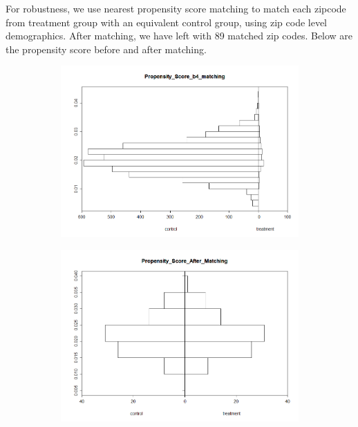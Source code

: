 For robustness, we use nearest propensity score matching to match each zipcode from treatment group with an equivalent control group, using zip code level demographics. After matching, we have left with 89 matched zip codes. Below are the propensity score before and after matching.

\begin{figure}
     \centering
     \begin{subfigure}
         \centering
         \includegraphics[width=\textwidth]{b4matching.png}
         \label{fig:b4matching}
     \end{subfigure}
     \hfill
     \begin{subfigure}
         \centering
         \includegraphics[width=\textwidth]{Aftermatching.png}
         \label{fig:aftermatching}
     \end{subfigure}
\end{figure}

